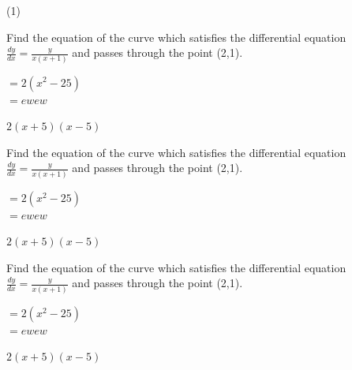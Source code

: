 
\begin{mtask}[start=1](1)
   \task \begin{exercise} Find the equation of the curve which satisfies the differential equation $ \frac{dy}{dx}=\frac{y}{x(x+1)}$ and passes through the point (2,1).\\
              \begin{envSolution}
                 $ =2(x^2-25)   $\\
                 $ = ewe w $\\
                 \begin{shortsolution}  
                       $ 2(x+5)(x-5)$
                 \end{shortsolution}
               \end{envSolution}
         \end{exercise}

   \task \begin{exercise} Find the equation of the curve which satisfies the differential equation $ \frac{dy}{dx}=\frac{y}{x(x+1)}$ and passes through the point (2,1).\\
              \begin{envSolution}
                 $ =2(x^2-25)   $\\
                 $ = ewe w $\\
                 \begin{shortsolution}  
                       $ 2(x+5)(x-5)$
                 \end{shortsolution}
               \end{envSolution}
         \end{exercise}

   \task \begin{exercise} Find the equation of the curve which satisfies the differential equation $ \frac{dy}{dx}=\frac{y}{x(x+1)}$ and passes through the point (2,1).\\
              \begin{envSolution}
                 $ =2(x^2-25)   $\\
                 $ = ewe w $\\
                 \begin{shortsolution}  
                       $ 2(x+5)(x-5)$
                 \end{shortsolution}
               \end{envSolution}
         \end{exercise}
\end{mtask}




